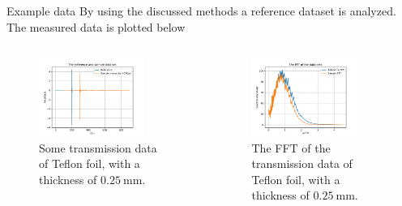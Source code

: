 \documentclass[aspectratio=1610, 9pt]{beamer}
\begin{document}
\begin{frame}{Example data}
  By using the discussed methods a reference dataset is analyzed.
  The measured data is plotted below 
  \begin{center}
    \begin{columns}
      \begin{column}{0.5\textwidth}
        \begin{figure}
          \includegraphics[width=0.8\textwidth]{images/THz1.pdf}
          \caption{Some transmission data of Teflon foil, with a thickness of $\SI{0.25}{\milli\meter}$.}
        \end{figure}
      \end{column}
      \begin{column}{0.5\textwidth}
        \begin{figure}
          \includegraphics[width=0.8\textwidth]{images/THz4_1.pdf}
          \caption{The FFT of the transmission data of Teflon foil, with a thickness of $\SI{0.25}{\milli\meter}$.}
        \end{figure}
      \end{column}
    \end{columns}
  \end{center}
\end{frame}
\end{document}
